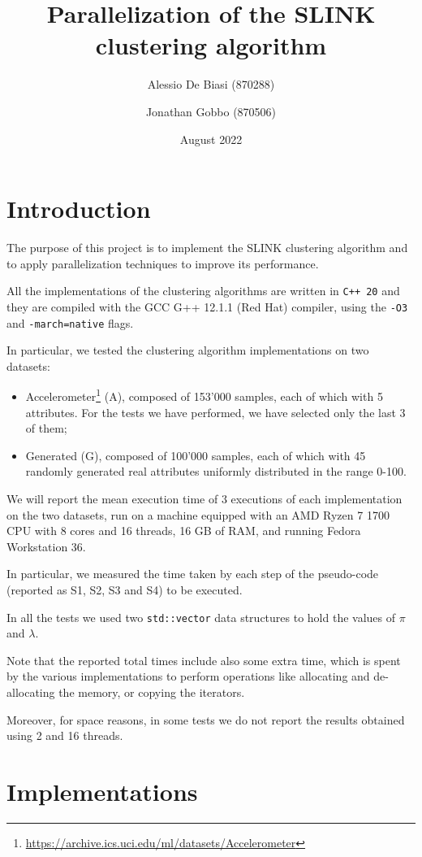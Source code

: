 \documentclass{article}
\title{Parallelization of the SLINK clustering algorithm\vspace{-1.25ex}}
\author{Alessio De Biasi (870288) \and Jonathan Gobbo (870506)}
\date{August 2022}
\begin{document}
\twocolumn
\maketitle

\section{Introduction}

The purpose of this project is to implement the SLINK clustering algorithm and to apply
parallelization techniques to improve its performance.

All the implementations of the clustering algorithms are written in \texttt{C++ 20} and they are
compiled with the GCC G++ 12.1.1 (Red Hat) compiler, using the \texttt{-O3} and
\texttt{-march=native} flags.

In particular, we tested the clustering algorithm implementations on two datasets:
\begin{itemize}
\item Accelerometer\footnote{\url{https://archive.ics.uci.edu/ml/datasets/Accelerometer}} (A),
composed
of 153'000 samples, each of which with 5 attributes. For the tests we have performed, we have
selected only the last 3 of them;
\item Generated (G), composed of 100'000 samples, each of which with 45 randomly generated real
attributes uniformly distributed in the range 0-100.
\end{itemize}

We will report the mean execution time of 3 executions of each implementation on the two datasets,
run on a machine equipped with an AMD Ryzen 7 1700 CPU with 8 cores and 16 threads, 16 GB of RAM,
and running Fedora Workstation 36.

In particular, we measured the time taken by each step of the pseudo-code (reported as S1, S2, S3
and S4) to be executed.

In all the tests we used two \texttt{std::vector} data structures to hold the values of $\pi$ and
$\lambda$.

Note that the reported total times include also some extra time, which is spent by the various
implementations to perform operations like allocating and de-allocating the memory, or copying
the iterators.

Moreover, for space reasons, in some tests we do not report the results obtained using 2 and 16
threads.

\hypertarget{implementations}{
\section{Implementations}
\label{implementations}}
\end{document}
